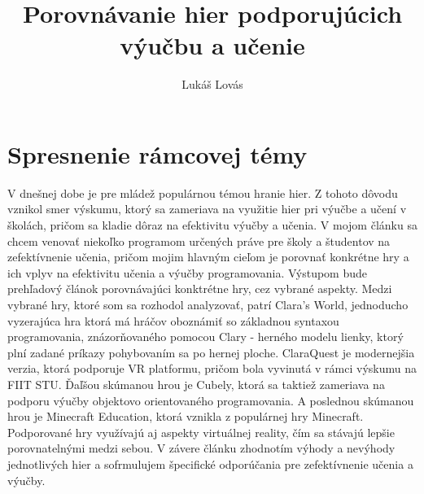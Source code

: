 \documentclass{article}
\title{Porovnávanie hier podporujúcich výučbu a učenie}
\author{Lukáš Lovás}
\begin{document}
\maketitle

\section{Spresnenie rámcovej témy}
V dnešnej dobe je pre mládež populárnou témou hranie hier. Z tohoto dôvodu vznikol smer výskumu, ktorý sa zameriava na využitie hier pri výučbe a učení v školách, pričom sa kladie dôraz na efektivitu výučby a učenia. V mojom článku sa chcem venovať niekoľko programom určených práve pre školy a študentov na zefektívnenie učenia, pričom mojim hlavným cieľom je porovnať konkrétne hry a ich vplyv na efektivitu učenia a výučby programovania. Výstupom bude prehľadový článok porovnávajúci konktrétne hry, cez vybrané aspekty. Medzi vybrané hry, ktoré som sa rozhodol analyzovať, patrí Clara's World\cite{ClarasWorld}, jednoducho vyzerajúca hra ktorá má hráčov oboznámiť so základnou syntaxou programovania, znázorňovaného pomocou Clary - herného modelu lienky, ktorý plní zadané príkazy pohybovaním sa po hernej ploche. ClaraQuest\cite{ClaraQuest} je modernejšia verzia, ktorá podporuje VR platformu, pričom bola vyvinutá v rámci výskumu na FIIT STU. Ďaľšou skúmanou hrou je Cubely, ktorá sa taktiež zameriava na podporu výučby objektovo orientovaného programovania. A poslednou skúmanou hrou je Minecraft Education, ktorá vznikla z populárnej hry Minecraft. Podporované hry využívajú aj aspekty virtuálnej reality, čím sa stávajú lepšie porovnatelnými medzi sebou. V závere článku zhodnotím výhody a nevýhody jednotlivých hier a sofrmulujem špecifické odporúčania pre zefektívnenie učenia a výučby. 



\end{document}
